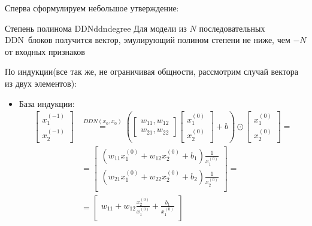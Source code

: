 \documentclass{report}
\begin{document}
\par Сперва сформулируем небольшое утверждение:
\begin{theo}{Степень полинома DDN}{ddndegree}
    Для модели из $N$ последовательных \color{PineGreen}DDN\color{black}\ блоков получится вектор, 
    эмулирующий полином степени не ниже, чем $-N$ от входных признаков
\end{theo}
\begin{tcolorbox}[title=Доказательство, breakable, enhanced]
    \par По индукции(все так же, не ограничивая общности, рассмотрим случай вектора из двух элементов):
    \begin{itemize}
        \item База индукции:
        \begin{align}
            \label{ddn:intro:inductionbase}
            \begin{bmatrix}
                x_1^{(-1)}\\
                x_2^{(-1)}
            \end{bmatrix}
            &\overset{DDN(x_0, x_0)}{=} 
            \left(
                \begin{bmatrix}
                    w_{11}, w_{12}\\
                    w_{21}, w_{22}
                \end{bmatrix}
                \begin{bmatrix}
                    x_1^{(0)}\\
                    x_2^{(0)}
                \end{bmatrix}
                +b  
            \right)
            \odot
            \begin{bmatrix}
                x_1^{(0)}\\
                x_2^{(0)}
            \end{bmatrix}=\\
            &=\begin{bmatrix}
                \left(w_{11}x_1^{(0)} + w_{12}x_2^{(0)}+b_1\right)\frac{1}{x_1^{(0)}}\\
                \left(w_{21}x_1^{(0)} + w_{22}x_2^{(0)}+b_2\right)\frac{1}{x_2^{(0)}}\\
            \end{bmatrix} = \\
            &=\begin{bmatrix}
                w_{11} + w_{12}\frac{x_2^{(0)}}{x_1^{(0)}}+\frac{b_1}{x_1^{(0)}}\\

\end{bmatrix}
\end{align}
\end{itemize}
\end{tcolorbox}
\end{document}
